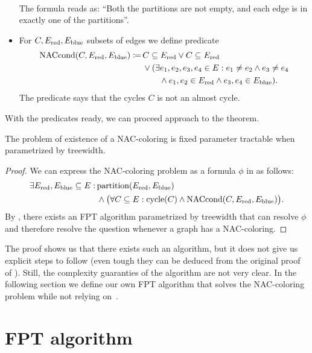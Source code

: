 \begin{itemize}
\begin{align*}
	      \end{align*}
	      The formula reads as: ``Both the partitions are not empty,
	      and each edge is in exactly one of the partitions''.
	\item For \( C, E_{\text{red}}, E_{\text{blue}} \) subsets of edges we define predicate
	      \begin{align*}
		      \text{NACcond}(C, E_{\text{red}}, E_{\text{blue}}) \coloneqq \,
		       & C \subseteq E_{\text{red}} \lor C \subseteq E_{\text{red}}
		      \\
		       & \lor (\exists e_1, e_2, e_3, e_4 \in E :
		      e_1 \ne e_2 \land e_3 \ne e_4
		      \\
		       & \qquad \land e_1, e_2 \in E_{\text{red}} \land e_3, e_4 \in E_{\text{blue}} ).
	      \end{align*}
	      The predicate says that the cycles \( C \) is not an almost cycle.
\end{itemize}
%

With the predicates ready, we can proceed approach to the theorem.
%
\begin{theorem}
	The problem of existence of a NAC-coloring is fixed parameter
	tractable when parametrized by treewidth.
\end{theorem}
%
\begin{proof}
	We can express the NAC-coloring problem
	as a formula \( \phi \) in \MSO{} as follows:
	\begin{align*}
		\exists E_{\text{red}}, E_{\text{blue}} \subseteq E : \,
		 & \text{partition}(E_{\text{red}}, E_{\text{blue}})                                                                 \\
		 & \land \big(\forall C \subseteq E : \text{cycle}(C) \land \text{NACcond}(C, E_{\text{red}}, E_{\text{blue}}) \big)
		.
	\end{align*}
	By ,
	there exists an FPT algorithm parametrized by treewidth
	that can resolve \( \phi \) and therefore resolve the question whenever a graph has a NAC-coloring.
\end{proof}
%
The proof shows us that there exists such an algorithm,
but it does not give us explicit steps to follow
(even tough they can be deduced from the original proof of ).
Still, the complexity guaranties of the algorithm are not very clear.
In the following section we define our
own FPT algorithm that solves the NAC-coloring problem
while not relying on~\MSO{}.

\section{FPT algorithm}

